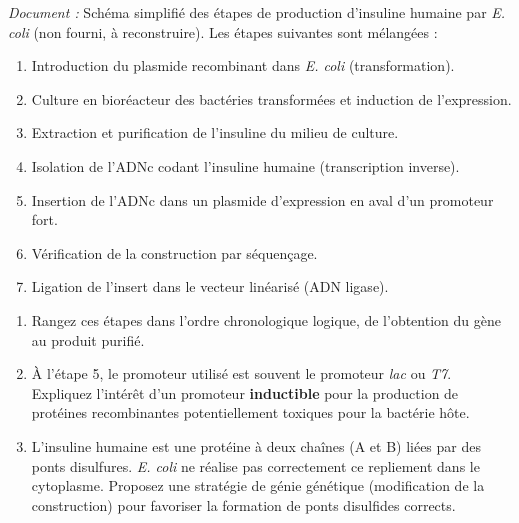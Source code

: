\documentclass[11pt]{article}
\begin{document}
\begin{exercice}
\emph{Document :} Schéma simplifié des étapes de production d'insuline humaine par \textit{E. coli} (non fourni, à reconstruire).
Les étapes suivantes sont mélangées :
\begin{enumerate}
    \item Introduction du plasmide recombinant dans \textit{E. coli} (transformation).
    \item Culture en bioréacteur des bactéries transformées et induction de l'expression.
    \item Extraction et purification de l'insuline du milieu de culture.
    \item Isolation de l'ADNc codant l'insuline humaine (transcription inverse).
    \item Insertion de l'ADNc dans un plasmide d'expression en aval d'un promoteur fort.
    \item Vérification de la construction par séquençage.
    \item Ligation de l'insert dans le vecteur linéarisé (ADN ligase).
\end{enumerate}

\begin{enumerate}
    \item Rangez ces étapes dans l'ordre chronologique logique, de l'obtention du gène au produit purifié.
    \item À l'étape 5, le promoteur utilisé est souvent le promoteur \textit{lac} ou \textit{T7}. Expliquez l'intérêt d'un promoteur \textbf{inductible} pour la production de protéines recombinantes potentiellement toxiques pour la bactérie hôte.
    \item L'insuline humaine est une protéine à deux chaînes (A et B) liées par des ponts disulfures. \textit{E. coli} ne réalise pas correctement ce repliement dans le cytoplasme. Proposez une stratégie de génie génétique (modification de la construction) pour favoriser la formation de ponts disulfides corrects.
\end{enumerate}
\end{exercice}
\end{document}
